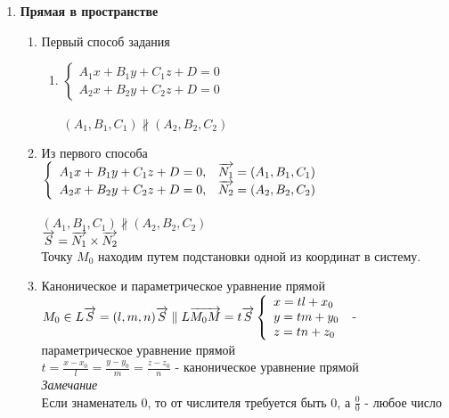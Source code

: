 \documentclass[12pt]{article}
\begin{document}
\begin{enumerate}
\begin{enumerate}
\end{enumerate}
\item \textbf{Прямая в пространстве}
\begin{enumerate}
    \item Первый способ задания
    \begin{enumerate}
        \item $\left\{\begin{array}{l}
            A_1x+B_1y+C_1z+D=0  \\
            A_2x+B_2y+C_2z+D=0
        \end{array}\right.$\\\\
        $(A_1,B_1,C_1) \nparallel (A_2,B_2,C_2)$
    \end{enumerate}
    \item Из первого способа\\
    $\left\{\begin{array}{ll}
            A_1x+B_1y+C_1z+D=0, & \overrightarrow{N_1} = (A_1,B_1,C_1)  \\
            A_2x+B_2y+C_2z+D=0, & \overrightarrow{N_2} = (A_2,B_2,C_2)
        \end{array}\right.$\\\\
        $(A_1,B_1,C_1) \nparallel (A_2,B_2,C_2)$\\
        $\overrightarrow{S} = \overrightarrow{N_1}\times\overrightarrow{N_2}$\\
        Точку $M_0$ находим путем подстановки одной из координат в систему.
    \item Каноническое и параметрическое уравнение прямой\\
    $M_0 \in L\\
    \overrightarrow{S} = (l,m,n)\\
    \overrightarrow{S} \parallel L\\
    \overrightarrow{M_0M} = t\overrightarrow{S}\\
    \left\{\begin{array}{l}
        x=tl+x_0  \\
        y = tm+y_0\\
        z = tn+z_0
    \end{array}\right.$ - параметрическое уравнение прямой\\
    $t=\frac{x-x_0}l=\frac{y-y_0}m=\frac{z-z_0}n$ - каноническое уравнение прямой\\
    \textit{Замечание}\\
    Если знаменатель 0, то от числителя требуется быть 0, а $\frac00$ - любое число
\end{enumerate}
\end{enumerate}
\end{document}
